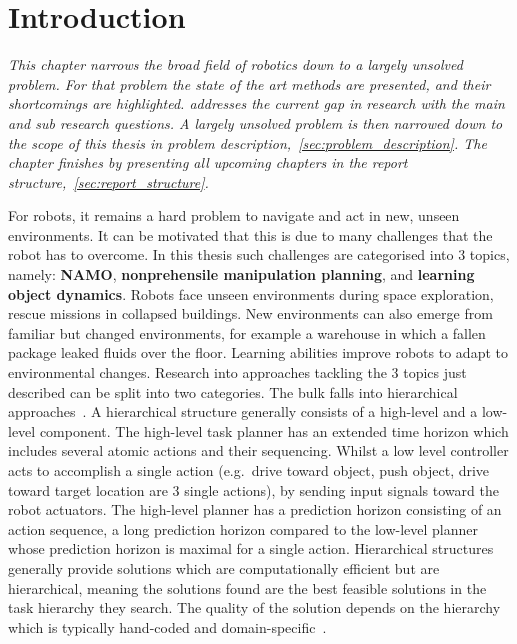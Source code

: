 \chapter{Introduction}%
\label{chap:introduction}
\textit{This chapter narrows the broad field of robotics down to a largely unsolved problem. For that problem the state of the art methods are presented, and their shortcomings are highlighted.  addresses the current gap in research with the main and sub research questions. A largely unsolved problem is then narrowed down to the scope of this thesis in problem description,~\cref{sec:problem_description}. The chapter finishes by presenting all upcoming chapters in the report structure,~\cref{sec:report_structure}.\bs}


For robots, it remains a hard problem to navigate and act in new, unseen environments. It can be motivated that this is due to many challenges that the robot has to overcome. In this thesis such challenges are categorised into 3 topics, namely: \textbf{\ac{NAMO}}, \textbf{nonprehensile manipulation planning}, and \textbf{learning object dynamics}. Robots face unseen environments during space exploration, rescue missions in collapsed buildings. New environments can also emerge from familiar but changed environments, for example a warehouse in which a fallen package leaked fluids over the floor. Learning abilities improve robots to adapt to environmental changes. Research into approaches tackling the 3 topics just described can be split into two categories. The bulk falls into hierarchical approaches~\cite{kaelbling_hierarchical_2011,scholz_navigation_2016,krontiris_dealing_2015}. A hierarchical structure generally consists of a high-level and a low-level component. The high-level task planner has an extended time horizon which includes several atomic actions and their sequencing. Whilst a low level controller acts to accomplish a single action (e.g.~drive toward object, push object, drive toward target location are 3 single actions), by sending input signals toward the robot actuators. The high-level planner has a prediction horizon consisting of an action sequence, a long prediction horizon compared to the low-level planner whose prediction horizon is maximal for a single action. Hierarchical structures generally provide solutions which are computationally efficient but are hierarchical, meaning the solutions found are the best feasible solutions in the task hierarchy they search. The quality of the solution depends on the hierarchy which is typically hand-coded and domain-specific~\cite {vega-brown_asymptotically_2020}. 

